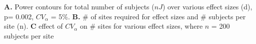 \label{fig:power} \textbf{A.} Power contours for total number of subjects ($nJ$) over various effect sizes (d), p= 0.002, $CV_\alpha$ = 5\%. \textbf{B.} \# of sites required for effect sizes and \# subjects per site (n). \textbf{C} effect of $CV_\alpha$ on \# sites for various effect sizes, where $n$ = 200 subjects per site
